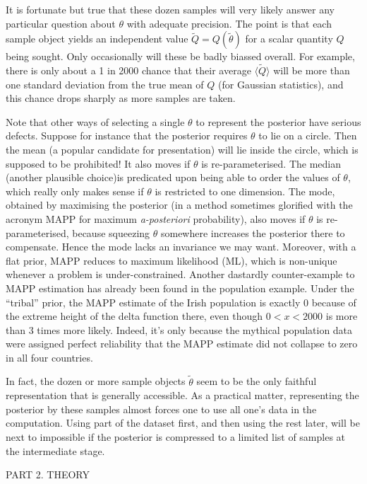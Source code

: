 It is fortunate but true that these dozen samples will very likely answer any particular question about $\theta$ with adequate precision.
The point is that each sample object yields an independent value $\tilde Q = Q(\tilde\theta)$ for a scalar quantity $Q$ being sought.
Only occasionally will these be badly biassed overall.  
For example, there is only about a 1 in 2000 chance that their average $\langle \tilde Q \rangle$ will be more than one standard deviation from the true mean 
of $Q$ (for Gaussian statistics), and this chance drops sharply as more samples are taken.

Note that other ways of selecting a single $\theta$ to represent the posterior have serious defects.  
Suppose for instance that the posterior requires $\theta$ to lie on a circle. 
Then the mean (a popular candidate for presentation) will lie inside the circle, which is supposed to be prohibited!
It also moves if $\theta$ is re-parameterised.
The median (another plausible choice)is predicated upon being able to order the values of $\theta$, which really only makes sense if $\theta$ is restricted to one dimension.
The mode, obtained by maximising the posterior (in a method sometimes glorified with the acronym MAPP for maximum {\it a-posteriori} probability), 
also moves if $\theta$ is re-parameterised, because squeezing $\theta$ somewhere increases the posterior there to compensate.  
Hence the mode lacks an invariance we may want.  
Moreover, with a flat prior, MAPP reduces to maximum likelihood (ML), which is non-unique whenever a problem is under-constrained.
Another dastardly counter-example to MAPP estimation has already been found in the population example.
Under the ``tribal'' prior, the MAPP estimate of the Irish population is exactly 0 because of the extreme height of the delta function there, 
even though $0 < x < 2000$ is more than 3 times more likely.
Indeed, it's only because the mythical population data were assigned perfect reliability that the MAPP estimate did not collapse to zero in all four countries.

In fact, the dozen or more sample objects $\tilde\theta$ seem to be the only faithful representation that is generally accessible.
As a practical matter, representing the posterior by these samples almost forces one to use all one's data in the computation.
Using part of the dataset first, and then using the rest later, 
will be next to impossible if the posterior is compressed to a limited list of samples at the intermediate stage.
\vfill\eject

\centerline{\bigger PART 2. THEORY}
\bigskip
{}
\bigskip

